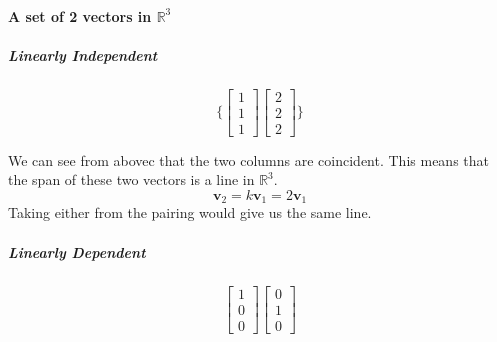 \documentclass{article}
\begin{document}
        \paragraph{A set of 2 vectors in $\mathbb{R}^3$}
            \subparagraph{Linearly Independent}
                \[
                \{
                    \begin{bmatrix}1\\1\\1\end{bmatrix}
                    \begin{bmatrix}2\\2\\2\end{bmatrix}
                \}
                \]
                We can see from abovec that the two columns are
                coincident. This means that the span of these two vectors
                is a line in $\mathbb{R}^3$.
                \[\mathbf{v}_2 = k\mathbf{v}_1 = 2\mathbf{v}_1\]
                Taking either from the pairing would give us the same line.
            \subparagraph{Linearly Dependent}
                \[
                    \begin{bmatrix}1\\0\\0\end{bmatrix}
                    \begin{bmatrix}0\\1\\0\end{bmatrix}
                \]
\end{document}
